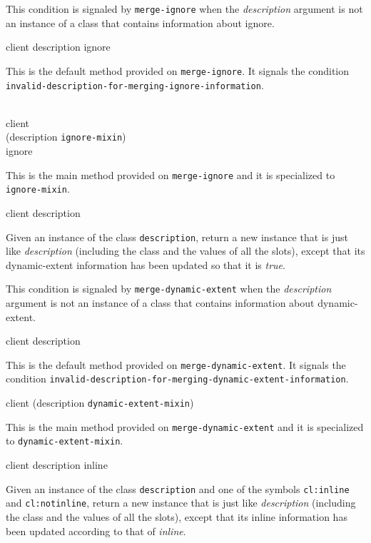 {\footnotesize
{}
}

This condition is signaled by \texttt{merge-ignore} when the
\textit{description} argument is not an instance of a class that
contains information about ignore.

{\footnotesize
{} {client description ignore}
}

This is the default method provided on \texttt{merge-ignore}.  It
signals the condition
\texttt{invalid-description-for-merging-ignore-information}.

{\footnotesize
{}\\
           {client\\
            (description {\tt ignore-mixin})\\
            ignore}
}

This is the main method provided on \texttt{merge-ignore}
and it is specialized to \texttt{ignore-mixin}.

{\footnotesize
{} {client description}
}

Given an instance of the class \texttt{description}, return a
new instance that is just like \textit{description}
(including the class and the values of all the slots), except that its
dynamic-extent information has been updated so that it is \emph{true}.

{\footnotesize
{}
}

This condition is signaled by \texttt{merge-dynamic-extent} when the
\textit{description} argument is not an instance of a class that
contains information about dynamic-extent.

{\footnotesize
{} {client description}
}

This is the default method provided on \texttt{merge-dynamic-extent}.  It
signals the condition
\texttt{invalid-description-for-merging-dynamic-extent-information}.

{\footnotesize
{} {client (description {\tt dynamic-extent-mixin})}
}

This is the main method provided on
\texttt{merge-dynamic-extent} and it is specialized to
\texttt{dynamic-extent-mixin}.

{\footnotesize
{} {client description inline}
}

Given an instance of the class \texttt{description} and one
of the symbols \texttt{cl:inline} and \texttt{cl:notinline},
return a new instance that is just like
\textit{description} (including the class and the values of
all the slots), except that its inline information has been updated
according to that of \textit{inline}.


